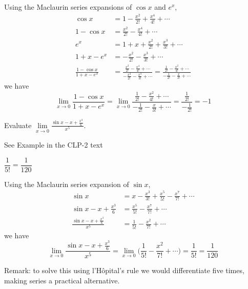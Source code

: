 \begin{solution}
Using the Maclaurin series expansions of $\cos x$ and $e^x$,
\begin{align*}
\cos x& = 1-\frac{x^2}{2!} +\frac{x^4}{4!} +\cdots \\
1-\cos x& = \frac{x^2}{2!} -\frac{x^4}{4!} +\cdots \\
e^x &= 1+x+ \frac{x^2}{2!} +\frac{x^3}{3!} +\cdots \\
1+x-e^x&=-\frac{x^2}{2!} -\frac{x^3}{3!} +\cdots \\
\frac{1-\cos x}{1+x-e^x}
&=\frac{\frac{x^2}{2!} -\frac{x^4}{4!} +\cdots }
        {-\frac{x^2}{2!} -\frac{x^3}{3!} +\cdots}
=\frac{\frac{1}{2!} -\frac{x^2}{4!} +\cdots }
        {-\frac{1}{2!} -\frac{x}{3!} +\cdots}
\end{align*}
we have
\begin{equation*}
\lim_{x\rightarrow 0}\frac{1-\cos x}{1+x-e^x}
=\lim_{x\rightarrow 0}\frac{\frac{1}{2!} -\frac{x^2}{4!} +\cdots }
        {-\frac{1}{2!} -\frac{x}{3!} +\cdots}
=\frac{\frac{1}{2!}} {-\frac{1}{2!}}
=-1
\end{equation*}
\end{solution}


\begin{Mquestion}[2012A]
Evaluate
$\displaystyle \lim\limits_{x\rightarrow 0}\frac{\sin x -x +\frac{x^3}{6}}{x^5}$.
\end{Mquestion}

\begin{hint}
See Example  in the
CLP-2 text
\end{hint}

\begin{answer}
$\dfrac{1}{5!}=\dfrac{1}{120}$
\end{answer}

\begin{solution}
Using the Maclaurin series expansion of $\sin x$,
\begin{align*}
\sin x& = x-\frac{x^3}{3!} +\frac{x^5}{5!} -\frac{x^7}{7!} +\cdots \\
\sin x-x +\frac{x^3}{6} & = \frac{x^5}{5!}-\frac{x^7}{7!} +\cdots \\
\frac{\sin x -x +\frac{x^3}{6}}{x^5}
&=\frac{1}{5!}-\frac{x^2}{7!} +\cdots
\end{align*}
we have
\begin{equation*}
\lim_{x\rightarrow 0}\frac{\sin x -x +\frac{x^3}{6}}{x^5}
=\lim_{x\rightarrow 0}\Big(\frac{1}{5!}-\frac{x^2}{7!} +\cdots\Big)
=\frac{1}{5!}
=\frac{1}{120}
\end{equation*}

Remark: to solve this using l'H\^{o}pital's rule we would differentiate five times, making series a practical alternative.
\end{solution}


